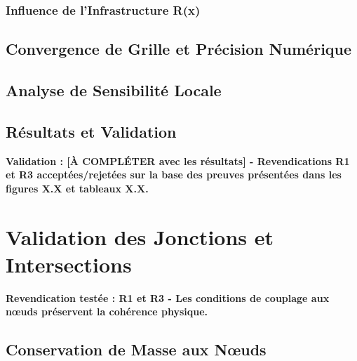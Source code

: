 \subsubsection{Influence de l'Infrastructure R(x)}

\subsection{Convergence de Grille et Précision Numérique}
\label{subsec:convergence_grille}

\subsection{Analyse de Sensibilité Locale}
\label{subsec:sensibilite_locale}

\subsection{Résultats et Validation}
\label{subsec:resultats_segment}

\textbf{Validation : [À COMPLÉTER avec les résultats] - Revendications R1 et R3 acceptées/rejetées sur la base des preuves présentées dans les figures X.X et tableaux X.X.}

\section{Validation des Jonctions et Intersections}
\label{sec:validation_jonctions}

\textbf{Revendication testée : R1 et R3 - Les conditions de couplage aux nœuds préservent la cohérence physique.}

\subsection{Conservation de Masse aux Nœuds}
\label{subsec:conservation_masse_noeuds}

